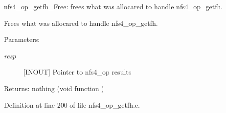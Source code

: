 nfs4\_\-op\_\-getfh\_\-Free: frees what was allocared to handle nfs4\_\-op\_\-getfh.

Frees what was allocared to handle nfs4\_\-op\_\-getfh.

\begin{Desc}
\item[Parameters:]
\begin{description}
\item[{\em resp}][INOUT] Pointer to nfs4\_\-op results\end{description}
\end{Desc}
\begin{Desc}
\item[Returns:]nothing (void function ) \end{Desc}


Definition at line 200 of file nfs4\_\-op\_\-getfh.c.